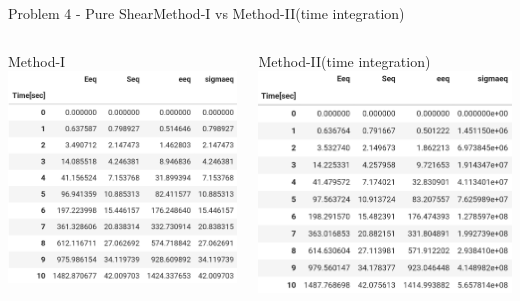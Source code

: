 \documentclass{beamer}
\begin{document}
\begin{frame}{Problem 4 - Pure Shear}{Method-I vs Method-II(time integration)}
    \vspace{-2em}
    \begin{columns}
        \begin{block}{\footnotesize Method-I}
            \includegraphics[width=\textwidth]{Values/m2t4.png}
        \end{block}
        \begin{block}{\footnotesize Method-II(time integration)}
            \includegraphics[width=\textwidth]{Values/m1t4.png}
        \end{block}
    \end{columns}
\end{frame}
\end{document}
